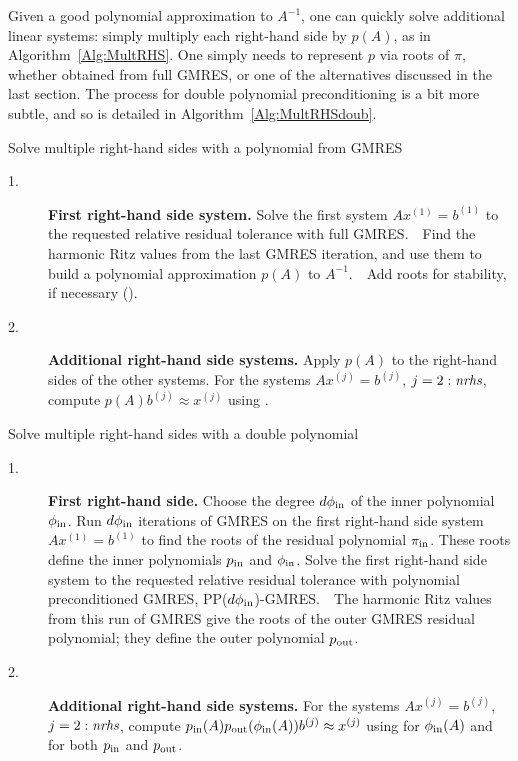 \documentclass{siamart}
\def\nrhs{\mbox{{\it nrhs}}}
\def\dphiin{d\phi_{\rm in}}
\begin{document}
Given a good polynomial approximation to $A^{-1}$, one can quickly solve additional linear systems: 
simply multiply each right-hand side by $p(A)$, as in Algorithm~\ref{Alg:MultRHS}. 
One simply needs to represent $p$ via roots of $\pi$, whether obtained from full GMRES, or one of the alternatives discussed in the last section.  
The process for double polynomial preconditioning is a bit more subtle, and so is detailed in Algorithm~\ref{Alg:MultRHSdoub}.

\begin{algorithm}[h!]
    \caption{Solve multiple right-hand sides with a polynomial from GMRES}
    \begin{description}
    \item[1.] {\bf First right-hand side system.} Solve the first system $Ax^{(1)}=b^{(1)}$ to the requested relative residual tolerance with full GMRES.\ \ Find the harmonic Ritz values from the last GMRES iteration, and use them to build a polynomial approximation $p(A)$ to $A^{-1}$.\ \   Add roots for stability, if necessary (\cite[alg.~2]{PPGStable}).
    \item[2.] {\bf Additional right-hand side systems.} Apply $p(A)$ to the right-hand sides of the other systems.  For the systems $Ax^{(j)}=b^{(j)}$, $j=2:\nrhs$, compute $p(A)b^{(j)} \approx x^{(j)}$ using \cite[alg.~3]{PPGStable}.
\end{description}
\label{Alg:MultRHS}
\end{algorithm}

\begin{algorithm}[t!]
    \caption{Solve multiple right-hand sides with a double polynomial}
    \begin{description}
    \item[1.] {\bf First right-hand side.} Choose the degree $\dphiin$ of the inner polynomial $\phi_{\rm in}$.  Run $\dphiin$ iterations of GMRES on the first right-hand side system $Ax^{(1)}=b^{(1)}$ to find the roots of the residual polynomial $\pi_{\rm in}$.  These roots define the inner polynomials $p_{\rm in}$ and $\phi_{\rm in}$.  Solve the first right-hand side system to the requested relative residual tolerance with polynomial preconditioned GMRES, PP($\dphiin$)-GMRES.\ \  The harmonic Ritz values from this run of GMRES give the roots of the outer GMRES residual polynomial; they define the outer polynomial $p_{\rm out}$.
    \item[2.] {\bf Additional right-hand side systems.} For the systems $Ax^{(j)}=b^{(j)}$, $j=2:\nrhs$, compute $p_{\rm in}(A)p_{\rm out}(\phi_{\rm in}(A)) b^{(j)} \approx x^{(j)}$ using \cite[alg.~1]{PPGStable} for $\phi_{\rm in}(A)$ and~\cite[alg.~3]{PPGStable} for both $p_{\rm in}$ and $p_{\rm out}$.
\end{description}
\label{Alg:MultRHSdoub}
\end{algorithm}
\end{document}
